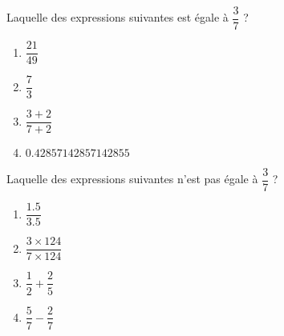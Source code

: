 
\begin{exercice}\label{exo2smath-0088}

    Laquelle des expressions suivantes est égale à \( \dfrac{ 3 }{ 7 }\) ?
    \begin{multicols}{4}
        \begin{enumerate}
            \item
                \( \dfrac{ 21 }{ 49 }\)
            \item
                \( \dfrac{ 7 }{ 3 }\)
            \item
                \( \dfrac{ 3+2 }{ 7+2 }\)
            \item
    $0.42857142857142855$
        \end{enumerate}
    \end{multicols}

    Laquelle des expressions suivantes n'est pas égale à \( \dfrac{ 3 }{ 7 }\) ?
    \begin{multicols}{4}
        \begin{enumerate}
            \item
                \( \dfrac{ 1.5 }{ 3.5 }\)
            \item
                \( \dfrac{ 3\times 124 }{ 7\times 124 }\)
            \item
                \( \dfrac{ 1 }{ 2 }+\dfrac{ 2 }{ 5 }\)
            \item
                \( \dfrac{ 5 }{ 7 }-\dfrac{ 2 }{ 7 }\)
        \end{enumerate}
    \end{multicols}

\end{exercice}
